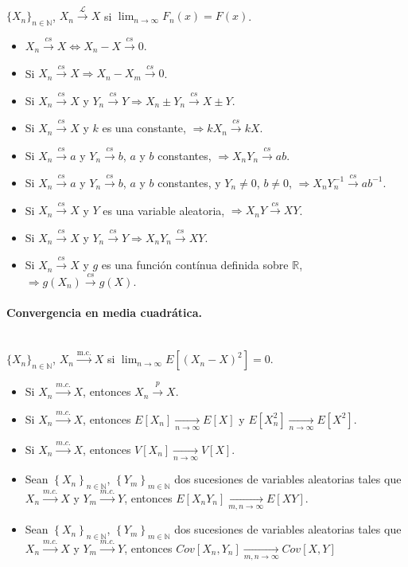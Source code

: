 \documentclass[oneside,spanish,a4paper]{article}
\begin{document}
~\\$\{X_n\}_{n\in \mathbb{N}}$, $X_n\overset{\mathcal{L}}{\to}X$ si $\lim_{n\to\infty}F_n(x)=F(x)$.
\begin{itemize}
\item $X_n\overset{cs}{\to}X\Leftrightarrow X_n-X\overset{cs}{\to}0$.
\item Si $X_n\overset{cs}{\to}X\Rightarrow  X_n-X_m\overset{cs}{\to}0$.
\item Si $X_n\overset{cs}{\to}X$ y $Y_n\overset{cs}{\to}Y\Rightarrow X_n\pm Y_n\overset{cs}{\to}X\pm Y$.
\item Si $X_n\overset{cs}{\to}X$ y $k$ es una constante, $\Rightarrow kX_n\overset{cs}{\to}kX$.\item Si $X_n\overset{cs}{\to}a$ y $Y_n\overset{cs}{\to}b$, $a$ y $b$ constantes, $\Rightarrow X_nY_n\overset{cs}{\to}ab$.
\item Si $X_n\overset{cs}{\to}a$ y $Y_n\overset{cs}{\to}b$, $a$ y $b$ constantes, y $Y_n\neq0$, $b\neq0$, $\Rightarrow X_nY_n^{-1}\overset{cs}{\to}ab^{-1}$.
\item Si $X_n\overset{cs}{\to}X$ y $Y$ es una variable aleatoria, $\Rightarrow X_nY\overset{cs}{\to}XY$.
\item Si $X_n\overset{cs}{\to}X$ y $Y_n\overset{cs}{\to}Y\Rightarrow X_nY_n\overset{cs}{\to}XY$.
\item Si $X_n\overset{cs}{\to}X$ y $g$ es una funci\'on cont\'inua definida sobre $\mathbb{R}$, $\Rightarrow g(X_n)\overset{cs}{\to}g(X)$.
\end{itemize}

\paragraph{Convergencia en media cuadr\'atica.}

~\\$\{X_n\}_{n\in \mathbb{N}}$, $X_n\overset{\text{m.c.}}{\to}X$ si $\lim_{n\to\infty}E[(X_n-X)^2]=0$.
\begin{itemize}
\item Si $X_{n} \overset{m.c.}{\to} X $, entonces $X_{n} \overset{p}{\to} X $.
\item Si $X_{n} \overset{m.c.}{\to} X $, entonces $E[X_n]\underset{n\to\infty}{\to}E[X]$ y $E[X_n^2]\underset{n\to\infty}{\to}E[X^2]$.
\item Si $X_{n} \overset{m.c.}{\to} X $, entonces $V[X_n]\underset{n\to\infty}{\to}V[X]$.
\item Sean $ \left\{X_n\right\}_{n\in\mathbb{N}}$, $ \left\{Y_m\right\}_{m\in\mathbb{N}}$ dos sucesiones de variables aleatorias tales que $X_{n} \overset{m.c.}{\to} X $ y $Y_{m} \overset{m.c.}{\to} Y $, entonces $E[X_nY_n]\underset{m,n\to\infty}{\to}E[XY]$.
\item Sean $ \left\{X_n\right\}_{n\in\mathbb{N}}$, $ \left\{Y_m\right\}_{m\in\mathbb{N}}$ dos sucesiones de variables aleatorias tales que $X_{n} \overset{m.c.}{\to} X $ y $Y_{m} \overset{m.c.}{\to} Y $, entonces $Cov[X_n,Y_n]\underset{m,n\to\infty}{\to}Cov[X,Y]$

\end{itemize}
\end{document}
